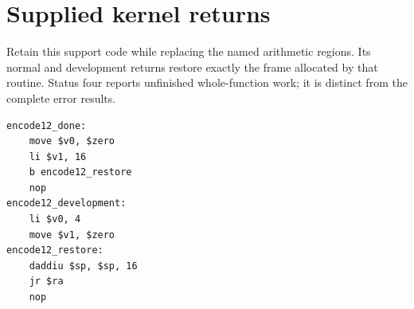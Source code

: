 \section{Supplied kernel returns}
Retain this support code while replacing the named arithmetic regions. Its normal and development returns restore exactly the frame allocated by that routine. Status four reports unfinished whole-function work; it is distinct from the complete error results.

\begin{verbatim}
encode12_done:
    move $v0, $zero
    li $v1, 16
    b encode12_restore
    nop
encode12_development:
    li $v0, 4
    move $v1, $zero
encode12_restore:
    daddiu $sp, $sp, 16
    jr $ra
    nop
\end{verbatim}
